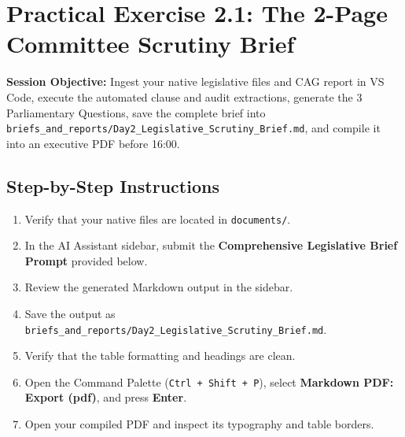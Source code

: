 \documentclass[11pt, a4paper]{report}
\begin{document}
\section{Practical Exercise 2.1: The 2-Page Committee Scrutiny Brief}
\textbf{Session Objective:} Ingest your native legislative files and CAG report in VS Code, execute the automated clause and audit extractions, generate the 3 Parliamentary Questions, save the complete brief into \texttt{briefs\_and\_reports/Day2\_Legislative\_Scrutiny\_Brief.md}, and compile it into an executive PDF before 16:00.

\subsection{Step-by-Step Instructions}
\begin{enumerate}[label=\textbf{Step \arabic*:}]
    \item Verify that your native files are located in \texttt{documents/}.
    \item In the AI Assistant sidebar, submit the \textcolor{tanzaniablue}{\textbf{Comprehensive Legislative Brief Prompt}} provided below.
    \item Review the generated Markdown output in the sidebar.
    \item Save the output as \texttt{briefs\_and\_reports/Day2\_Legislative\_Scrutiny\_Brief.md}.
    \item Verify that the table formatting and headings are clean.
    \item Open the Command Palette (\texttt{Ctrl + Shift + P}), select \textbf{Markdown PDF: Export (pdf)}, and press \textbf{Enter}.
    \item Open your compiled PDF and inspect its typography and table borders.
\end{enumerate}
\end{document}

